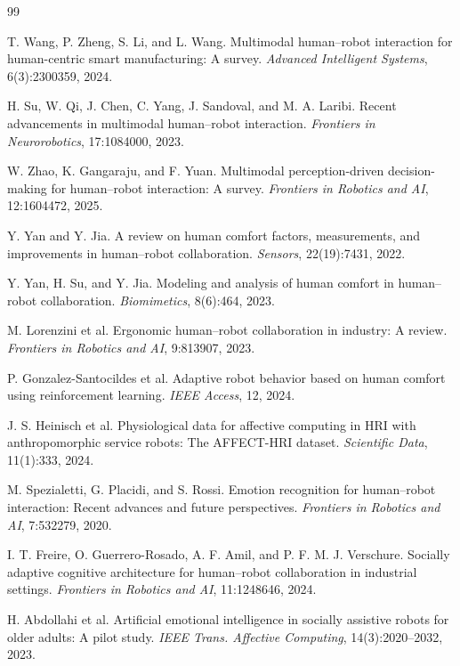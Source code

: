 \documentclass{article}
\begin{document}
\begin{thebibliography}{99}

 T. Wang, P. Zheng, S. Li, and L. Wang. Multimodal human--robot interaction for human-centric smart manufacturing: A survey. \emph{Advanced Intelligent Systems}, 6(3):2300359, 2024.

 H. Su, W. Qi, J. Chen, C. Yang, J. Sandoval, and M. A. Laribi. Recent advancements in multimodal human--robot interaction. \emph{Frontiers in Neurorobotics}, 17:1084000, 2023.

 W. Zhao, K. Gangaraju, and F. Yuan. Multimodal perception-driven decision-making for human--robot interaction: A survey. \emph{Frontiers in Robotics and AI}, 12:1604472, 2025.

 Y. Yan and Y. Jia. A review on human comfort factors, measurements, and improvements in human--robot collaboration. \emph{Sensors}, 22(19):7431, 2022.

 Y. Yan, H. Su, and Y. Jia. Modeling and analysis of human comfort in human--robot collaboration. \emph{Biomimetics}, 8(6):464, 2023.

 M. Lorenzini et al. Ergonomic human--robot collaboration in industry: A review. \emph{Frontiers in Robotics and AI}, 9:813907, 2023.

 P. Gonzalez-Santocildes et al. Adaptive robot behavior based on human comfort using reinforcement learning. \emph{IEEE Access}, 12, 2024.

 J. S. Heinisch et al. Physiological data for affective computing in HRI with anthropomorphic service robots: The AFFECT-HRI dataset. \emph{Scientific Data}, 11(1):333, 2024.

 M. Spezialetti, G. Placidi, and S. Rossi. Emotion recognition for human--robot interaction: Recent advances and future perspectives. \emph{Frontiers in Robotics and AI}, 7:532279, 2020.

 I. T. Freire, O. Guerrero-Rosado, A. F. Amil, and P. F. M. J. Verschure. Socially adaptive cognitive architecture for human--robot collaboration in industrial settings. \emph{Frontiers in Robotics and AI}, 11:1248646, 2024.

 H. Abdollahi et al. Artificial emotional intelligence in socially assistive robots for older adults: A pilot study. \emph{IEEE Trans. Affective Computing}, 14(3):2020--2032, 2023.


\end{thebibliography}
\end{document}
